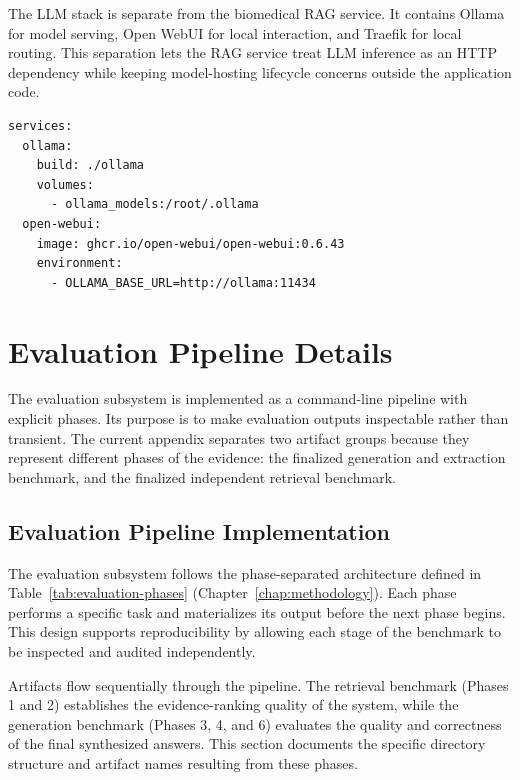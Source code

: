The LLM stack is separate from the biomedical RAG service. It contains Ollama for model serving, Open WebUI for local interaction, and Traefik for local routing. This separation lets the RAG service treat LLM inference as an HTTP dependency while keeping model-hosting lifecycle concerns outside the application code.

\begin{lstlisting}[language={},caption={Representative local LLM Compose services.}]
services:
  ollama:
    build: ./ollama
    volumes:
      - ollama_models:/root/.ollama
  open-webui:
    image: ghcr.io/open-webui/open-webui:0.6.43
    environment:
      - OLLAMA_BASE_URL=http://ollama:11434
\end{lstlisting}

\section{Evaluation Pipeline Details}
\label{sec:appendix-eval-pipeline}

The evaluation subsystem is implemented as a command-line pipeline with explicit phases. Its purpose is to make evaluation outputs inspectable rather than transient. The current appendix separates two artifact groups because they represent different phases of the evidence: the finalized generation and extraction benchmark, and the finalized independent retrieval benchmark.

\subsection{Evaluation Pipeline Implementation}

The evaluation subsystem follows the phase-separated architecture defined in Table~\ref{tab:evaluation-phases} (Chapter~\ref{chap:methodology}). Each phase performs a specific task and materializes its output before the next phase begins. This design supports reproducibility by allowing each stage of the benchmark to be inspected and audited independently.

Artifacts flow sequentially through the pipeline. The retrieval benchmark (Phases 1 and 2) establishes the evidence-ranking quality of the system, while the generation benchmark (Phases 3, 4, and 6) evaluates the quality and correctness of the final synthesized answers. This section documents the specific directory structure and artifact names resulting from these phases.

